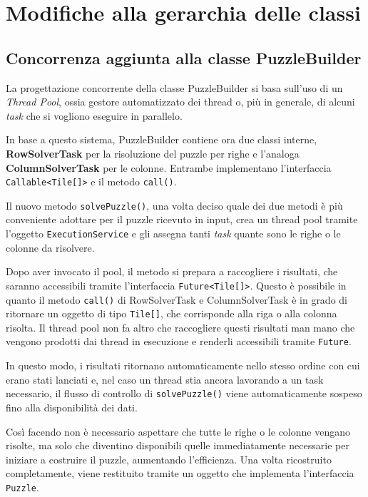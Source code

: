 \documentclass[a4paper, 12pt]{article}
\newcommand{\strong}[1]{ \textbf{#1}}
\begin{document}
\section{Modifiche alla gerarchia delle classi}

\subsection{Concorrenza aggiunta alla classe PuzzleBuilder}

La progettazione concorrente della classe PuzzleBuilder si basa sull'uso di un
\emph{Thread Pool}, ossia gestore automatizzato dei thread o, più in generale,
di alcuni \emph{task} che si vogliono eseguire in parallelo.

In base a questo sistema, PuzzleBuilder contiene ora due classi interne,
\strong{RowSolverTask} per la risoluzione del puzzle per righe e l'analoga
\strong{ColumnSolverTask} per le colonne. Entrambe implementano l'interfaccia
\verb|Callable<Tile[]>| e il metodo \verb|call()|.

Il nuovo metodo \verb|solvePuzzle()|, una volta deciso quale dei due metodi è
più conveniente adottare per il puzzle ricevuto in input, crea un thread pool
tramite l'oggetto \verb|ExecutionService| e gli assegna tanti \emph{task} quante
sono le righe o le colonne da risolvere.

Dopo aver invocato il pool, il metodo si prepara a raccogliere i risultati, che
saranno accessibili tramite l'interfaccia \verb|Future<Tile[]>|. Questo è
possibile in quanto il metodo \verb|call()| di RowSolverTask e ColumnSolverTask
è in grado di ritornare un oggetto di tipo \verb|Tile[]|, che corrisponde alla
riga o alla colonna risolta. Il thread pool non fa altro che raccogliere questi
risultati man mano che vengono prodotti dai thread in esecuzione e renderli
accessibili tramite \verb|Future|.

In questo modo, i risultati ritornano automaticamente nello stesso ordine con
cui erano stati lanciati e, nel caso un thread stia ancora lavorando a un task
necessario, il flusso di controllo di \verb|solvePuzzle()| viene automaticamente
sospeso fino alla disponibilità dei dati.

Così facendo non è necessario aspettare che tutte le righe o le colonne vengano
risolte, ma solo che diventino disponibili quelle immediatamente necessarie per
iniziare a costruire il puzzle, aumentando l'efficienza. Una volta ricostruito
completamente, viene restituito tramite un oggetto che implementa l'interfaccia
\verb|Puzzle|.
\end{document}
